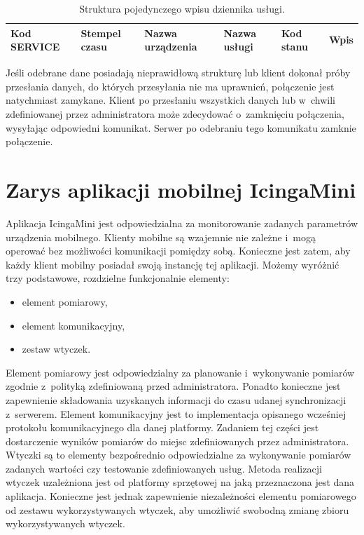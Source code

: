 \begin{table}[H]
\centering
\caption{Struktura pojedynczego wpisu dziennika usługi. }
\begin{tabular}{|p{2cm}|p{2cm}|p{3cm}|p{2cm}|p{1cm}|p{2cm}|}
  \hline
  \raggedright{Kod SERVICE} & \raggedright{Stempel czasu} & \raggedright{Nazwa urządzenia} & \raggedright{Nazwa usługi} & \raggedright{Kod stanu} & Wpis  \\
  \hline
\end{tabular}
\end{table}

Jeśli odebrane dane posiadają nieprawidłową strukturę lub klient
dokonał próby przesłania danych, do których przesyłania nie ma
uprawnień, połączenie jest natychmiast zamykane. Klient po przesłaniu
wszystkich danych lub w~chwili zdefiniowanej przez administratora może
zdecydować o~zamknięciu połączenia, wysyłając odpowiedni
komunikat. Serwer po odebraniu tego komunikatu zamknie połączenie.


\section[IcingaMini][Zarys aplikacji mobilnej IcingaMini]{Zarys aplikacji mobilnej IcingaMini}
\label{sec:IcingaMini}

Aplikacja IcingaMini jest odpowiedzialna za monitorowanie zadanych
parametrów urządzenia mobilnego. Klienty mobilne są wzajemnie nie
zależne i~mogą operować bez możliwości komunikacji pomiędzy
sobą. Konieczne jest zatem, aby każdy klient mobilny posiadał swoją
instancję tej aplikacji. Możemy wyróżnić trzy podstawowe, rozdzielne
funkcjonalnie elementy:

\begin{itemize}
\item element pomiarowy,
\item element komunikacyjny,
\item zestaw wtyczek.
\end{itemize}

Element pomiarowy jest odpowiedzialny za planowanie i~wykonywanie
pomiarów zgodnie z~polityką zdefiniowaną przed administratora. Ponadto
konieczne jest zapewnienie składowania uzyskanych informacji do czasu
udanej synchronizacji z~serwerem. Element komunikacyjny jest to
implementacja opisanego wcześniej protokołu komunikacyjnego dla danej
platformy. Zadaniem tej części jest dostarczenie wyników pomiarów do
miejsc zdefiniowanych przez administratora. Wtyczki są to elementy
bezpośrednio odpowiedzialne za wykonywanie pomiarów zadanych wartości
czy testowanie zdefiniowanych usług. Metoda realizacji wtyczek
uzależniona jest od platformy sprzętowej na jaką przeznaczona jest
dana aplikacja. Konieczne jest jednak zapewnienie niezależności
elementu pomiarowego od zestawu wykorzystywanych wtyczek, aby
umożliwić swobodną zmianę zbioru wykorzystywanych wtyczek.

